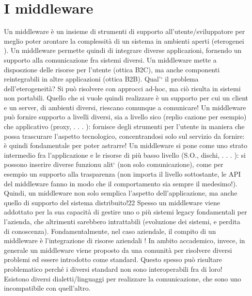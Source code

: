 \section{I middleware}
Un middleware è un insieme di strumenti di supporto all'utente/sviluppatore
per meglio poter arontare la complessità di un sistema in ambienti aperti
(eterogenei ). Un middleware permette quindi di integrare diverse applicazioni,
fornendo un supporto alla comunicazione fra sistemi diversi.
Un middleware mette a disposzione delle risorse per l'utente (ottica B2C),
ma anche componenti reintegrabili in altre applicazioni (ottica B2B).
Qual'` il problema dell'eterogeneità? Si può risolvere con approcci ad-hoc,
ma ciò risulta in sistemi non portabili. Quello che si vuole quindi realizzare è un
supporto per cui un client e un server, di ambienti diversi, riescano comunque
a comunicare!
Un middleware può fornire supporto a livelli diversi, sia a livello sico (replio
cazione per esempio) che applicativo (proxy, . . . ): fornisce degli strumenti per
l'utente in maniera che possa trascurare l'aspetto tecnologico, concentrandosi
solo sul servizio da fornire: è quindi fondamentale per poter astrarre!
Un middleware si pone come uno strato intermedio fra l'applicazione e le
risorse di più basso livello (S.O., dischi, . . . ): si possono inserire diverse funzionu
alit` (non solo comunicazione), come per esempio un supporto alla trasparenza
(non importa il livello sottostante, le API del middleware fanno in modo che
il comportamento sia sempre il medesimo!). Quindi, un middleware non solo
semplica l'aspetto dell'applicazione, ma anche quello di supporto del sistema
distribuito!22
Spesso un middleware viene addottato per la sua capacità di gestire uno o più
sistemi legacy fondamentali per l'azienda, che altrimenti sarebbero intrattabili
(evoluzione dei sistemi, e perdita di conoscenza). Fondamentalmente, nel caso
aziendale, il compito di un middleware è l'integrazione di risorse aziendali !
In ambito accademico, invece, in generale un middleware viene proposto da
una comunità per risolvere diversi problemi ed essere introdotto come standard.
Questo spesso può risultare problematico perché i diversi standard non sono
interoperabili fra di loro! Esistono diversi dialetti/linguaggi per realizzare la
comunicazione, che sono uno incompatibile con quell'altro.
